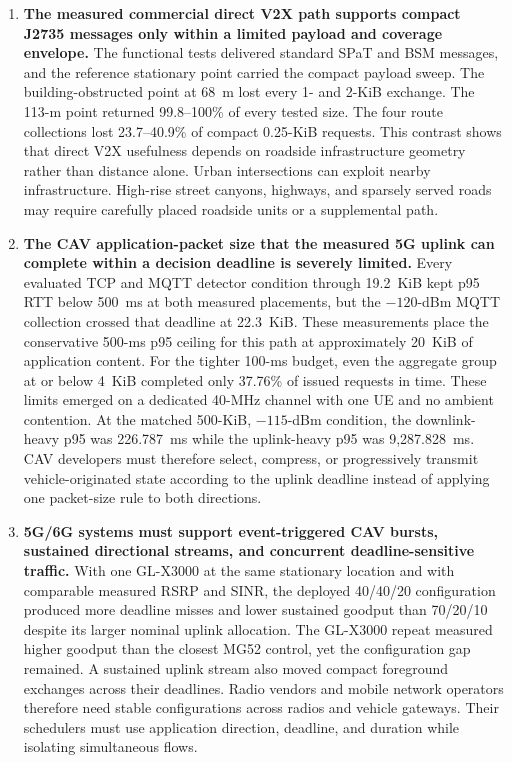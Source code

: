 \begin{enumerate}
  \renewcommand{\labelenumi}{\arabic{enumi})}
  \item \textbf{The measured commercial direct V2X path supports compact J2735
  messages only within a limited payload and coverage envelope.} The functional tests delivered
  standard SPaT and BSM messages, and the reference stationary point carried the
  compact payload sweep. The building-obstructed point at 68~m lost every 1-
  and 2-KiB exchange. The 113-m point returned 99.8--100\% of every tested size.
  The four route collections lost 23.7--40.9\% of compact 0.25-KiB requests. This
  contrast shows that direct V2X usefulness depends on roadside infrastructure
  geometry rather than distance alone. Urban intersections can exploit nearby
  infrastructure. High-rise street canyons, highways, and sparsely served roads
  may require carefully placed roadside units or a supplemental path.

  \item \textbf{The CAV application-packet size that the measured 5G uplink can
  complete within a decision deadline is severely limited.} Every evaluated
  TCP and MQTT detector condition through 19.2~KiB kept p95 RTT below 500~ms at
  both measured placements, but the $-120$-dBm MQTT collection crossed that deadline at
  22.3~KiB. These measurements place the conservative 500-ms p95 ceiling for
  this path at approximately 20~KiB of application content. For the tighter
  100-ms budget, even the aggregate group at or below 4~KiB completed only
  37.76\% of issued requests in time. These limits emerged on a dedicated
  40-MHz channel with one UE and no ambient contention. At the matched
  500-KiB, $-115$-dBm condition, the downlink-heavy p95 was 226.787~ms while
  the uplink-heavy p95 was 9,287.828~ms. CAV developers must therefore select,
  compress, or progressively transmit vehicle-originated state according to
  the uplink deadline instead of applying one packet-size rule to both
  directions.

  \item \textbf{5G/6G systems must support event-triggered CAV bursts,
  sustained directional streams, and concurrent deadline-sensitive traffic.}
  With one GL-X3000 at the same
  stationary location and with comparable measured RSRP and SINR, the deployed
  40/40/20 configuration produced more deadline
  misses and lower sustained goodput than 70/20/10 despite its larger nominal
  uplink allocation. The GL-X3000 repeat measured higher goodput than the
  closest MG52 control, yet the configuration gap remained. A sustained uplink stream also moved compact
  foreground exchanges across their deadlines. Radio vendors and mobile
  network operators therefore need stable configurations across radios and
  vehicle gateways. Their
  schedulers must use application direction, deadline, and duration while
  isolating simultaneous flows.
\end{enumerate}
